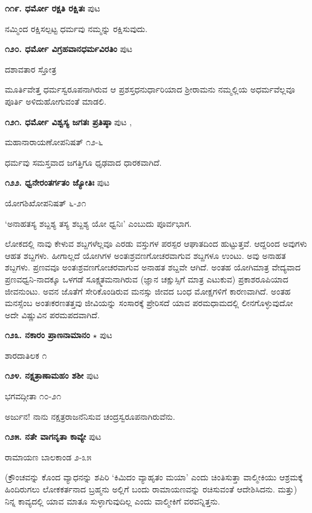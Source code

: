 \medskip
\noindent\textbf{೧೧೯. ಧರ್ಮೋ ರಕ್ಷತಿ ರಕ್ಷಿತಃ} \hfill ಪುಟ \pageref{225}

ನಮ್ಮಿಂದ ರಕ್ಷಿಸಲ್ಪಟ್ಟ ಧರ್ಮವು ನಮ್ಮನ್ನು ರಕ್ಷಿಸುವುದು.

\medskip
\noindent\textbf{೧೨೦. ಧರ್ಮೋ ವಿಗ್ರಹವಾನಧರ್ಮವಿರತಿಂ} \hfill ಪುಟ \pageref{138}

\hfill ದಶಾವತಾರ ಸ್ತೋತ್ರ

ಮೂರ್ತಿವೇತ್ತ ಧರ್ಮಸ್ವರೂಪನಾಗಿರುವ ಆ ಪ್ರಶಸ್ತಧನುರ್ಧಾರಿಯಾದ ಶ್ರೀರಾಮನು ನಮ್ಮಲ್ಲಿಯ ಅಧರ್ಮವೆಲ್ಲವೂ ಪೂರ್ತಿ ಅಳಿದುಹೋಗುವಂತೆ ಮಾಡಲಿ.

\medskip
\noindent\textbf{೧೨೧. ಧರ್ಮೋ ವಿಶ್ವಸ್ಯ ಜಗತಃ ಪ್ರತಿಷ್ಠಾ} \hfill ಪುಟ \pageref{182},\pageref{207}

\hfill ಮಹಾನಾರಾಯಣೋಪನಿಷತ್ ೧೨-೬

ಧರ್ಮವು ಸಮಸ್ತವಾದ ಜಗತ್ತಿಗೂ ಧೃಢವಾದ ಧಾರಕವಾಗಿದೆ.

\medskip
\noindent\textbf{೧೨೨. ಧ್ವನೇರಂತರ್ಗತಂ  ಜ್ಯೋತಿಃ} \hfill ಪುಟ \pageref{87}

\hfill ಯೋಗಶಿಖೋಪನಿಷತ್ ೬-೨೧

`ಅನಾಹತಸ್ಯ ಶಬ್ದಶ್ಯ ತಸ್ಯ ಶಬ್ದಶ್ಯ ಯೋ ಧ್ವನಿಃ'  ಎಂಬುದು ಪೂರ್ವಭಾಗ.

ಲೋಕದಲ್ಲಿ ನಾವು ಕೇಳುವ ಶಬ್ದಗಳೆಲ್ಲವೂ ಎರಡು ವಸ್ತುಗಳ ಪರಸ್ಪರ ಆಘಾತದಿಂದ ಹುಟ್ಟುತ್ತವೆ. ಆದ್ದರಿಂದ ಅವುಗಳು ಆಹತ ಶಬ್ದಗಳು. ಹೀಗಾಲ್ಲದೆ ಯೋಗಿಗಳ ಅಂತಃಶ್ರವಣಗೋಚರವಾಗುವ ಶಬ್ದಗಳೂ ಉಂಟು. ಅವು ಅನಾಹತ ಶಬ್ದಗಳು. ಪ್ರಣವವೂ ಅಂತಃಶ್ರವಣಗೋಚರವಾಗುವ ಅನಾಹತ ಶಬ್ದವೇ ಆಗಿದೆ. ಅಂತಹ ಯೋಗಿಮಾತ್ರ ವೇದ್ಯವಾದ ಪ್ರಣವಧ್ವನಿ-ನಾದಕ್ಕೂ ಒಳಗಡೆ ಸೂಕ್ಷ್ಮತಮನಾಗಿರುವ (ಜ್ಞಾನ ಚಕ್ಷುಸ್ಸಿಗೆ ಮಾತ್ರ ಎಟುಕುವ) ಪ್ರಕಾಶರೂಪಿಯಾದ ಜೀವನುಂಟು. ಅವನ ಜೊತೆಗೆ ಸೇರಿಕೊಂಡಿರುವ ಮನಸ್ಸು ಜೀವದ ಬಂಧ ಮೋಕ್ಷಗಳಿಗೆ ಕಾರಣವಾಗಿದೆ. ಅಂತಹ ಮನಸ್ಸೆಂಬ ಅಂತಃಕರಣತತ್ತವು ಜೀವಿಯನ್ನು ಸಂಸಾರಕ್ಕೆ ಪ್ರೇರಿಸದೆ ಯಾವ ಪರಮಧಾಮದಲ್ಲಿ ಲೀನಗೊಳ್ಳುವುದೋ ಅದೇ ವಿಷ್ಣುವಿನ ಪರಮಪದವಾಗಿದೆ.

\medskip
\noindent\textbf{೧೨೩. ನಕಾರಂ ಪ್ರಾಣನಾಮಾನಂ} $\star$ \hfill ಪುಟ \pageref{17}

\hfill ಶಾರದಾತಿಲಕ ೧

\medskip
\noindent\textbf{೧೨೪. ನಕ್ಷತ್ರಾಣಾಮಹಂ ಶಶೀ} \hfill ಪುಟ \pageref{98}

\hfill ಭಗವದ್ಗೀತಾ ೧೦-೨೧

ಅರ್ಜುನ! ನಾನು ನಕ್ಷತ್ರರಾಜನೆನಿಸುವ ಚಂದ್ರಸ್ವರೂಪನಾಗಿರುವೆನು.

\medskip
\noindent\textbf{೧೨೫. ನತೇ ವಾಗನೃತಾ ಕಾವ್ಯೇ} \hfill ಪುಟ \pageref{209}

\hfill ರಾಮಾಯಣ ಬಾಲಕಾಂಡ ೨-೩೫

(ಕ್ರೌಂಚವನ್ನು ಕೊಂದ ವ್ಯಾಧನನ್ನು ಶಪಿರಿ `ಕಿಮಿದಂ ವ್ಯಾಹೃತಂ ಮಯಾ' ಎಂದು ಚಿಂತಿಸುತ್ತಾ ವಾಲ್ಮೀಕಿಯು ಆಶ್ರಮಕ್ಕೆ ಹಿಂದಿರುಗಲು ಲೋಕಕರ್ತನಾದ ಬ್ರಹ್ಮನು ಅಲ್ಲಿಗೆ ಬಂದು ರಾಮಾಯಣವನ್ನು ರಚಿಸುವಂತೆ ಆದೇಶಿಸಿದನು. ಮತ್ತು) ನಿನ್ನ ಕಾವ್ಯದಲ್ಲಿ ಯಾವ ಮಾತೂ ಸುಳ್ಳಾಗುವುದಿಲ್ಲ ಎಂದು ವಾಲ್ಮೀಕಿಗೆ ವರವನ್ನಿತ್ತನು.

